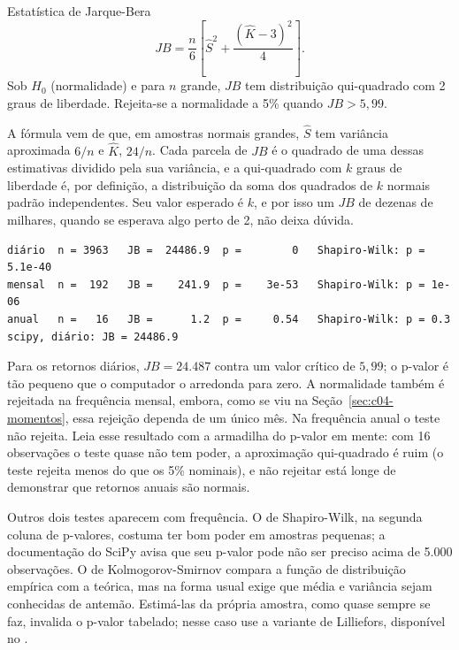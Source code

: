 \begin{resultado}{Estatística de Jarque-Bera}
\begin{equation}
  JB = \frac{n}{6}\left[\hat S^2 + \frac{(\hat K - 3)^2}{4}\right] .
  \label{eq:c04-jb}
\end{equation}
Sob $H_0$ (normalidade) e para $n$ grande, $JB$ tem distribuição qui-quadrado com 2 graus de liberdade. Rejeita-se a normalidade a 5\% quando $JB > 5,99$.
\end{resultado}

A fórmula vem de que, em amostras normais grandes, $\hat S$ tem variância aproximada $6/n$ e $\hat K$, $24/n$. Cada parcela de $JB$ é o quadrado de uma dessas estimativas dividido pela sua variância, e a qui-quadrado com $k$ graus de liberdade é, por definição, a distribuição da soma dos quadrados de $k$ normais padrão independentes. Seu valor esperado é $k$, e por isso um $JB$ de dezenas de milhares, quando se esperava algo perto de 2, não deixa dúvida.


\begin{lstlisting}[style=saida]
diário  n = 3963   JB =  24486.9  p =        0   Shapiro-Wilk: p = 5.1e-40
mensal  n =  192   JB =    241.9  p =    3e-53   Shapiro-Wilk: p = 1e-06
anual   n =   16   JB =      1.2  p =     0.54   Shapiro-Wilk: p = 0.3
scipy, diário: JB = 24486.9
\end{lstlisting}

Para os retornos diários, $JB = 24.487$ contra um valor crítico de $5,99$; o p-valor é tão pequeno que o computador o arredonda para zero. A normalidade também é rejeitada na frequência mensal, embora, como se viu na Seção~\ref{sec:c04-momentos}, essa rejeição dependa de um único mês. Na frequência anual o teste não rejeita. Leia esse resultado com a armadilha do p-valor em mente: com 16 observações o teste quase não tem poder, a aproximação qui-quadrado é ruim (o teste rejeita menos do que os 5\% nominais), e não rejeitar está longe de demonstrar que retornos anuais são normais.

Outros dois testes aparecem com frequência. O de Shapiro-Wilk, na segunda coluna de p-valores, costuma ter bom poder em amostras pequenas; a documentação do SciPy avisa que seu p-valor pode não ser preciso acima de 5.000 observações. O de Kolmogorov-Smirnov compara a função de distribuição empírica com a teórica, mas na forma usual exige que média e variância sejam conhecidas de antemão. Estimá-las da própria amostra, como quase sempre se faz, invalida o p-valor tabelado; nesse caso use a variante de Lilliefors, disponível no .

